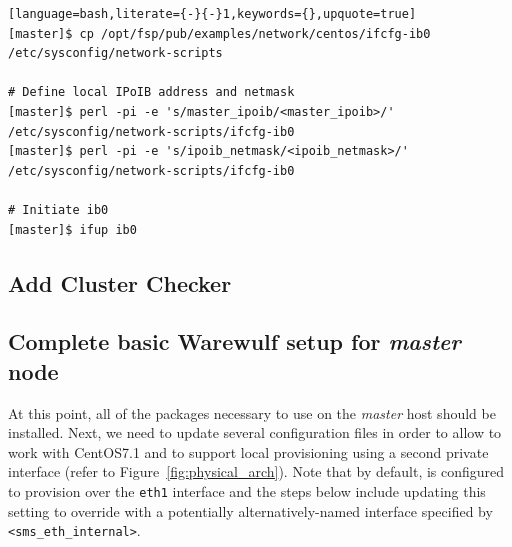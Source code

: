 \documentclass[letterpaper]{article}
\newcommand{\baseOS}{CentOS7.1}
\begin{document}
\begin{lstlisting}[language=bash,literate={-}{-}1,keywords={},upquote=true]
[master]$ cp /opt/fsp/pub/examples/network/centos/ifcfg-ib0 /etc/sysconfig/network-scripts

# Define local IPoIB address and netmask
[master]$ perl -pi -e 's/master_ipoib/<master_ipoib>/' /etc/sysconfig/network-scripts/ifcfg-ib0
[master]$ perl -pi -e 's/ipoib_netmask/<ipoib_netmask>/' /etc/sysconfig/network-scripts/ifcfg-ib0

# Initiate ib0
[master]$ ifup ib0
\end{lstlisting}

\subsection{Add Cluster Checker} \label{sec:add_clck}


\subsection{Complete basic Warewulf setup for {\em master} node}

At this point, all of the packages necessary to use \Warewulf{} on the {\em
  master} host should be installed.  Next, we need to update several
configuration files in order to allow \Warewulf{} to work with \baseOS{} and to
support local provisioning using a second private interface (refer to
Figure~\ref{fig:physical_arch}). Note that by default, \Warewulf{} is configured to
provision over the \texttt{eth1} interface and the steps below include updating
this setting to override with a potentially alternatively-named interface specified by
\texttt{<sms\_eth\_internal>}.


\end{document}
